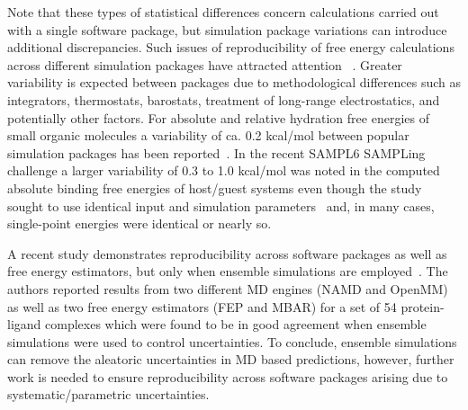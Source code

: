 \documentclass[9pt,bestpractices]{livecoms}
\begin{document}
Note that these types of statistical differences concern calculations carried out with a single software package, but simulation package variations can introduce additional discrepancies. Such issues of reproducibility of free energy calculations across different simulation packages have attracted attention ~\cite{loeffler2018reproducibility,rizzi2019sampl6, wade2022, herz2025modular}. Greater variability is expected between packages due to methodological differences such as integrators, thermostats, barostats, treatment of long-range electrostatics, and potentially other factors. For absolute and relative hydration free energies of small organic molecules a variability of ca. 0.2 kcal/mol between popular simulation packages has been reported~\cite{loeffler2018reproducibility}. In the recent SAMPL6 SAMPLing challenge a larger variability of 0.3 to 1.0 kcal/mol was noted in the computed absolute binding free energies of host/guest systems even though the study sought to use identical input and simulation parameters~\cite{rizzi2019sampl6} and, in many cases, single-point energies were identical or nearly so. 

A recent study demonstrates reproducibility across software packages as well as free energy estimators, but only when ensemble simulations are employed~\cite{wade2022}. The authors reported results from two different MD engines (NAMD and OpenMM) as well as two free energy estimators (FEP and MBAR) for a set of 54 protein-ligand complexes which were found to be in good agreement when ensemble simulations were used to control uncertainties. To conclude, ensemble simulations can remove the aleatoric uncertainties in MD based predictions, however, further work is needed to ensure reproducibility across software packages arising due to systematic/parametric uncertainties.
\end{document}
